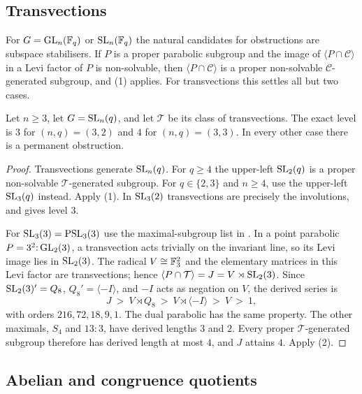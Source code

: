 \subsection{Transvections}
\label{sec:layers}

For $G=\operatorname{GL}_n(\mathbb{F}_q)$ or $\operatorname{SL}_n(\mathbb{F}_q)$ the natural candidates for
obstructions are subspace stabilisers. If $P$ is a proper parabolic
subgroup and the image of $\langle P\cap\mathcal C\rangle$ in a Levi
factor of $P$ is non-solvable, then $\langle P\cap\mathcal C\rangle$ is
a proper non-solvable $\mathcal C$-generated subgroup, and
(1) applies. For transvections this settles all but
two cases.

\begin{proposition}
\label{prop:transvection-levels}
Let $n\ge3$, let $G=\operatorname{SL}_n(q)$, and let $\mathcal T$ be its class of
transvections. The exact level is $3$ for
$(n,q)=(3,2)$ and $4$ for $(n,q)=(3,3)$. In every other case there is
a permanent obstruction.
\end{proposition}
\begin{proof}
Transvections generate $\operatorname{SL}_n(q)$. For $q\ge4$ the upper-left
$\operatorname{SL}_2(q)$ is a proper non-solvable $\mathcal T$-generated subgroup.
For $q\in\{2,3\}$ and $n\ge4$, use the upper-left $\operatorname{SL}_3(q)$ instead.
Apply (1). In $\operatorname{SL}_3(2)$ transvections are precisely
the involutions, and  gives level $3$.

For $\operatorname{SL}_3(3)=\operatorname{PSL}_3(3)$ use the maximal-subgroup list in
. In a point parabolic $P=3^2{:}\operatorname{GL}_2(3)$,
a transvection acts trivially on the invariant line, so its Levi image
lies in $\operatorname{SL}_2(3)$. The radical $V\cong\mathbb{F}_3^2$ and the elementary
matrices in this Levi factor are transvections; hence
$\langle P\cap\mathcal T\rangle=J=V\rtimes\operatorname{SL}_2(3)$.
Since $\operatorname{SL}_2(3)'=Q_8$, $Q_8'=\langle-I\rangle$, and $-I$ acts as
negation on $V$, the derived series is
\[
 J\ >\ V\rtimes Q_8\ >\ V\rtimes\langle-I\rangle\ >\ V\ >\ 1,
\]
with orders $216,72,18,9,1$. The dual parabolic has the same property.
The other maximals, $S_4$ and $13{:}3$, have derived lengths $3$ and $2$.
Every proper $\mathcal T$-generated subgroup therefore has derived
length at most $4$, and $J$ attains $4$. Apply (2).
\end{proof}

\subsection{Abelian and congruence quotients}

